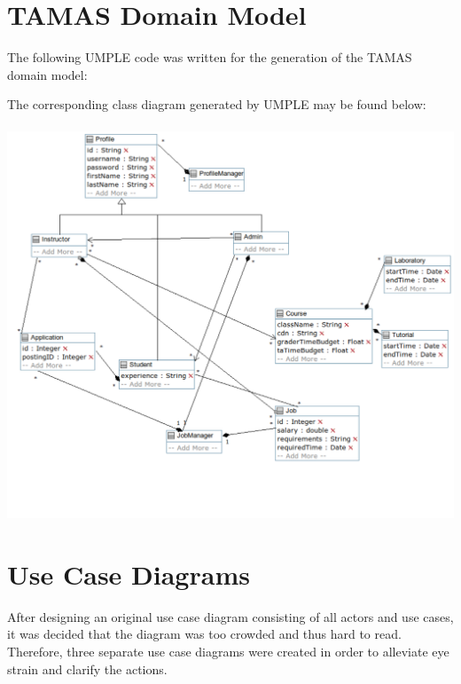 \documentclass[12pt]{report}
\begin{document}
\chapter{TAMAS Domain Model}
The following UMPLE code was written for the generation of the TAMAS domain model:

The corresponding class diagram generated by UMPLE may be found below:\\\\
\includegraphics[scale=0.6]{model/Diagrams/classdiagram}

\chapter{Use Case Diagrams}
After designing an original use case diagram consisting of all actors and use cases, it was decided
that the diagram was too crowded and thus hard to read. Therefore, three separate use case diagrams
were created in order to alleviate eye strain and clarify the actions.
\end{document}
